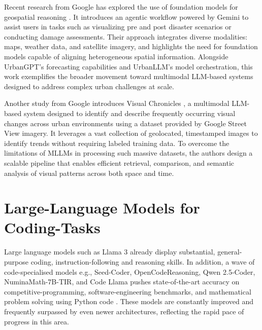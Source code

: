 Recent research from Google has explored the use of foundation models for geospatial reasoning \citep{2025GoogleGeospatialReasoning}. It introduces an agentic workflow powered by Gemini to assist users in tasks such as visualizing pre and post disaster scenarios or conducting damage assessments. Their approach integrates diverse modalities: maps, weather data, and satellite imagery, and highlights the need for foundation models capable of aligning heterogeneous spatial information. Alongside UrbanGPT's forecasting capabilities and UrbanLLM's model orchestration, this work exemplifies the broader movement toward multimodal LLM-based systems designed to address complex urban challenges at scale.

Another study from Google introduces Visual Chronicles \citep{Deng2025VisualChronicles}, a multimodal LLM-based system designed to identify and describe frequently occurring visual changes across urban environments using a dataset provided by Google Street View imagery. It leverages a vast collection of geolocated, timestamped images to identify trends without requiring labeled training data. To overcome the limitations of MLLMs in processing such massive datasets, the authors design a scalable pipeline that enables efficient retrieval, comparison, and semantic analysis of visual patterns across both space and time.




\section{Large-Language Models for Coding-Tasks}

Large language models such as Llama 3 \citep{Grattafiori2024Llama3} already display substantial, general-purpose coding, instruction-following and reasoning skills. In addition, a wave of code-specialised models e.g., Seed-Coder, OpenCodeReasoning, Qwen 2.5-Coder, NuminaMath-7B-TIR, and Code Llama pushes state-of-the-art accuracy on competitive-programming, software-engineering benchmarks, and mathematical problem solving using Python code \citep{Seed2025SeedCoder, Ahmad2025OCRNVidia, Hui2024Qwen25Coder, Roziere2024CodeLlama, Moshkov2025AIMO2, Yin2024MuMathCode, Gou2024ToRA}. These models are constantly improved and frequently surpassed by even newer architectures, reflecting the rapid pace of progress in this area.

